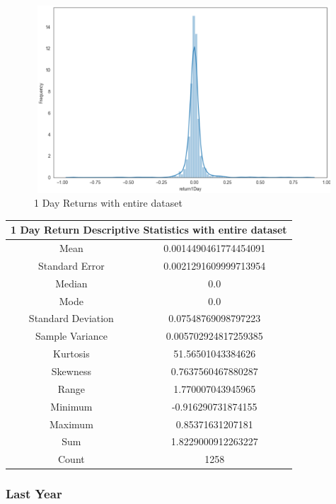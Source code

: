 \begin{figure}[h!]
    \centering
    \includegraphics[width=15cm,height=7cm,keepaspectratio]{resultsEvaluation/1returnDescMax.png}
    \caption{1 Day Returns with entire dataset}
    \label{fig:appendix_1returnDescMax}
\end{figure}
\begin{center}
\begin{tabular}{ c c }
\hline
\multicolumn{2}{|c|}{1 Day Return Descriptive Statistics with entire dataset} \\
\hline
Mean & 0.0014490461774454091 \\
Standard Error & 0.0021291609999713954 \\
Median & 0.0 \\
Mode & 0.0 \\
Standard Deviation & 0.07548769098797223 \\
Sample Variance & 0.005702924817259385 \\
Kurtosis & 51.56501043384626 \\
Skewness & 0.7637560467880287 \\
Range & 1.770007043945965 \\
Minimum & -0.916290731874155 \\
Maximum & 0.85371631207181 \\
Sum & 1.8229000912263227 \\
Count & 1258
\end{tabular}
\end{center}

\subsubsection{Last Year}

